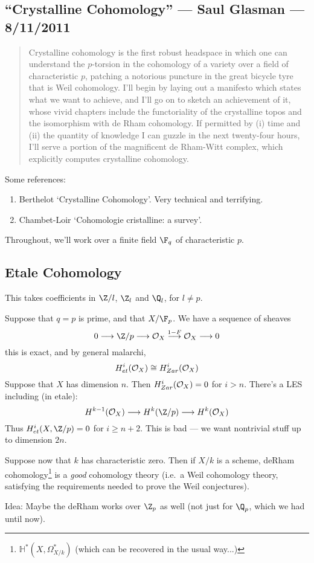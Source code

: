 \documentclass[11pt]{article}
\newcommand{\KanSemResponse}[1]
{
\thispagestyle{fancy}
\subsection*{#1}
}
\begin{document}
\begin{SaulCrystallineCohomology}
\KanSemResponse
{``Crystalline Cohomology'' --- Saul Glasman --- 8/11/2011}
\begin{abstract}
Crystalline cohomology is the first robust headspace in which one can understand the $p$-torsion in the cohomology of a variety over a field of characteristic $p$, patching a notorious puncture in the great bicycle tyre that is Weil cohomology. I'll begin by laying out a manifesto which states what we want to achieve, and I'll go on to sketch an achievement of it, whose vivid chapters include the functoriality of the crystalline topos and the isomorphism with de Rham cohomology. If permitted by (i) time and (ii) the quantity of knowledge I can guzzle in the next twenty-four hours, I'll serve a portion of the magnificent de Rham-Witt complex, which explicitly computes crystalline cohomology.
\end{abstract}
Some references:
\begin{enumerate}\squishlist
\item Berthelot `Crystalline Cohomology'. Very technical and terrifying.
\item Chambet-Loir `Cohomologie cristalline: a survey'.
\end{enumerate}
Throughout, we'll work over a finite field $\F_q$ of characteristic $p$.
\subsection*{Etale Cohomology}
This takes coefficients in $\Z/l$, $\Z_l$ and $\Q_l$, for $l\neq p$.

Suppose that $q=p$ is prime, and that $X/\F_p$. We have a sequence of sheaves
\[0\to\Z/p\to\calO_X\overset{1-F}{\to}\calO_X\to0\]
this is exact, and by general malarchi,
\[H^i_{et}(\mathcal{O}_X)\cong H^i_{Zar}(\mathcal{O}_X)\]
Suppose that $X$ has dimension $n$. Then $H^i_{Zar}(\mathcal{O}_X)=0$ for $i>n$. There's a LES including (in etale):
\[H^{k-1}(\calO_X)\to H^k(\Z/p)\to H^k(\calO_X)\]
Thus $H^i_{et}(X,\Z/p)=0$ for $i\geq n+2$. This is bad --- we want nontrivial stuff up to dimension $2n$.

Suppose now that $k$ has characteristic zero. Then if $X/k$ is a scheme, deRham cohomology\footnote{$\mathbb{H}^*(X,\Omega^*_{X/k})$ (which can be recovered in the usual way...)} is a \emph{good} cohomology theory (i.e.\ a Weil cohomology theory, satisfying the requirements needed to prove the Weil conjectures).

Idea: Maybe the deRham works over $\Z_p$ as well (not just for $\Q_p$, which we had until now).


\end{SaulCrystallineCohomology}
\end{document}

